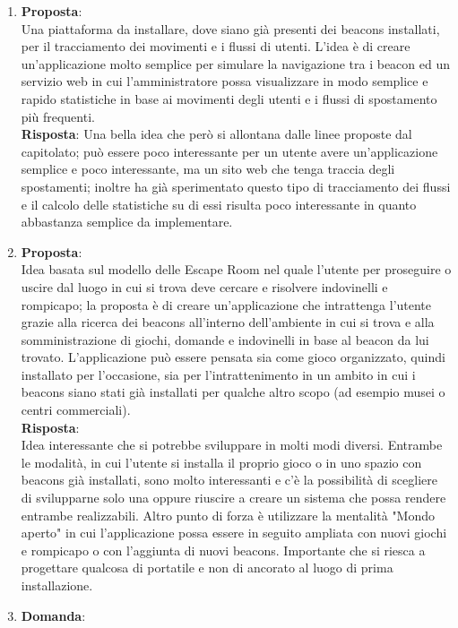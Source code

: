 \documentclass[a4paper,titlepage]{article}
\begin{document}
\begin{enumerate}
  \item \textbf{Proposta}: \\
  Una piattaforma da installare, dove siano già presenti dei beacons installati, per il tracciamento dei movimenti e i flussi di utenti. L'idea è di creare un'applicazione molto semplice per simulare la navigazione tra i beacon ed un servizio web in cui l'amministratore possa visualizzare in modo semplice e rapido statistiche in base ai movimenti degli utenti e i flussi di spostamento più frequenti. \\
  \textbf{Risposta}:
  Una bella idea che però si allontana dalle linee proposte dal capitolato; 
  può essere poco interessante per un utente avere un'applicazione semplice e poco interessante, ma un sito web che tenga traccia degli spostamenti; inoltre \PROPONENTE{} ha già sperimentato questo tipo di tracciamento dei flussi e il calcolo delle statistiche su di essi risulta poco interessante in quanto abbastanza semplice da implementare.
  \item \textbf{Proposta}: \\
  Idea basata sul modello delle Escape Room nel quale l'utente per proseguire o uscire dal luogo in cui si trova deve cercare e risolvere indovinelli e rompicapo; la proposta è di creare un'applicazione che intrattenga l'utente grazie alla ricerca dei beacons all'interno dell'ambiente in cui si trova e alla somministrazione di giochi, domande e indovinelli in base al beacon da lui trovato. L'applicazione può essere pensata sia come gioco organizzato, quindi installato per l'occasione, sia per l'intrattenimento in un ambito in cui i beacons siano stati già installati per qualche altro scopo (ad esempio musei o centri commerciali).\\
  \textbf{Risposta}: \\
  Idea interessante che si potrebbe sviluppare in molti modi diversi. Entrambe le modalità, in cui l'utente si installa il proprio gioco o in uno spazio con beacons già installati, sono molto interessanti e c'è la possibilità di scegliere di svilupparne solo una oppure riuscire a creare un sistema che possa rendere entrambe realizzabili. Altro punto di forza è utilizzare la mentalità "Mondo aperto" in cui l'applicazione possa essere in seguito ampliata con nuovi giochi e rompicapo o con l'aggiunta di nuovi beacons. Importante che si riesca a progettare qualcosa di portatile e non di ancorato al luogo di prima installazione.
  \item \textbf{Domanda}:\\

\end{enumerate}
\end{document}
